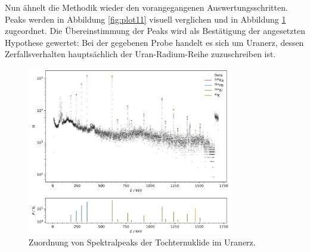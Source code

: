 Nun ähnelt die Methodik wieder den vorangegangenen Auswertungsschritten. Peaks werden in Abbildung \ref{fig:plot11} visuell
verglichen und in Abbildung \ref{fig:plot12} zugeordnet. Die Übereinstimmung der Peaks wird als Bestätigung der angesetzten Hypothese
gewertet: Bei der gegebenen Probe handelt es sich um Uranerz, dessen Zerfallsverhalten hauptsächlich der Uran-Radium-Reihe 
zuzuschreiben ist.

\begin{figure}[H]
    \centering
    \includegraphics[width=0.8\textwidth]{content/plots/plot12.jpg}
    \caption{Zuordnung von Spektralpeaks der Tochternuklide im Uranerz.}
    \label{fig:plot12}
\end{figure}
